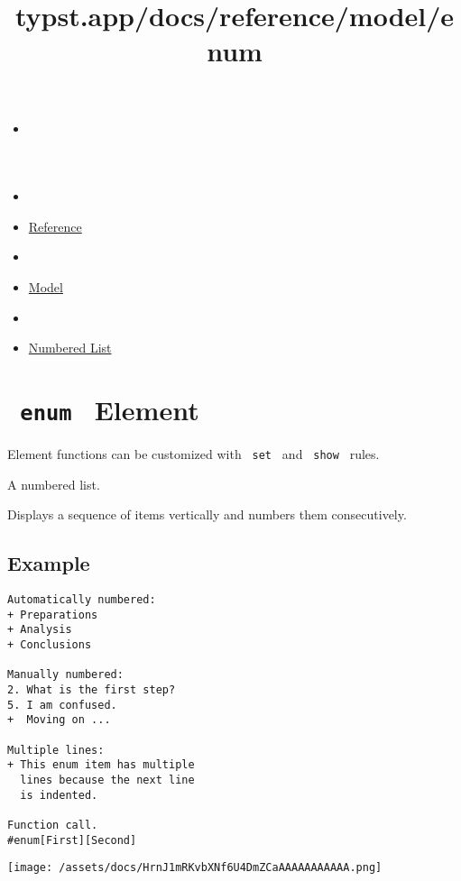 \title{typst.app/docs/reference/model/enum}

\begin{itemize}
\tightlist
\item
  \href{/docs}{}
\item
  
\item
  \href{/docs/reference/}{Reference}
\item
  
\item
  \href{/docs/reference/model/}{Model}
\item
  
\item
  \href{/docs/reference/model/enum/}{Numbered List}
\end{itemize}

\section{\texorpdfstring{\texttt{\ enum\ } {{ Element
}}}{ enum   Element }}\label{summary}

\label{element-tooltip}
Element functions can be customized with \texttt{\ set\ } and
\texttt{\ show\ } rules.

A numbered list.

Displays a sequence of items vertically and numbers them consecutively.

\subsection{Example}\label{example}

\begin{verbatim}
Automatically numbered:
+ Preparations
+ Analysis
+ Conclusions

Manually numbered:
2. What is the first step?
5. I am confused.
+  Moving on ...

Multiple lines:
+ This enum item has multiple
  lines because the next line
  is indented.

Function call.
#enum[First][Second]
\end{verbatim}

\texttt{[image: /assets/docs/HrnJ1mRKvbXNf6U4DmZCaAAAAAAAAAAA.png]}


